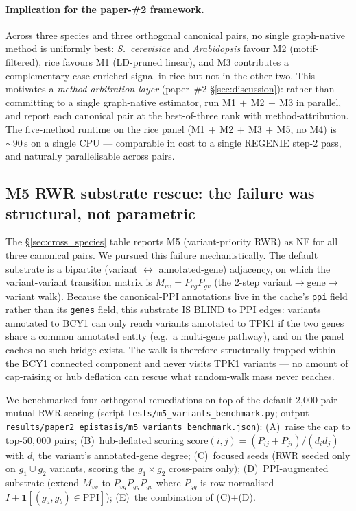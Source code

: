 \paragraph{Implication for the paper-\#2 framework.}
Across three species and three orthogonal canonical pairs, no single
graph-native method is uniformly best: \emph{S.~cerevisiae} and
\emph{Arabidopsis} favour M2 (motif-filtered), rice favours M1
(LD-pruned linear), and M3 contributes a complementary case-enriched
signal in rice but not in the other two. This motivates a
\emph{method-arbitration layer} (paper~\#2 §\ref{sec:discussion}):
rather than committing to a single graph-native estimator, run
M1$\,+\,$M2$\,+\,$M3 in parallel, and report each canonical pair at the
best-of-three rank with method-attribution. The five-method runtime on
the rice panel (M1$\,+\,$M2$\,+\,$M3$\,+\,$M5, no M4) is $\sim 90\,$s on
a single CPU --- comparable in cost to a single REGENIE step-2 pass,
and naturally parallelisable across pairs.

\subsection{M5 RWR substrate rescue: the failure was structural, not parametric}\label{sec:m5_substrate}

The §\ref{sec:cross_species} table reports M5 (variant-priority RWR) as
NF for all three canonical pairs. We pursued this failure
mechanistically. The default substrate is a bipartite (variant
$\leftrightarrow$ annotated-gene) adjacency, on which the variant-variant
transition matrix is $M_{vv} = P_{vg}P_{gv}$ (the 2-step
variant$\to$gene$\to$variant walk). Because the canonical-PPI annotations
live in the cache's \texttt{ppi} field rather than its \texttt{genes}
field, this substrate IS BLIND to PPI edges: variants annotated to BCY1
can only reach variants annotated to TPK1 if the two genes share a
common annotated entity (e.g.\ a multi-gene pathway), and on the panel
caches no such bridge exists. The walk is therefore structurally
trapped within the BCY1 connected component and never visits TPK1
variants --- no amount of cap-raising or hub deflation can rescue what
random-walk mass never reaches.

We benchmarked four orthogonal remediations on top of the default
2{,}000-pair mutual-RWR scoring (script
\texttt{tests/m5\_variants\_benchmark.py}; output
\texttt{results/paper2\_epistasis/m5\_variants\_benchmark.json}):
(A)~raise the cap to top-$50{,}000$ pairs; (B)~hub-deflated scoring
$\mathrm{score}(i,j) = (P_{ij}{+}P_{ji})/(d_i d_j)$ with $d_i$ the
variant's annotated-gene degree; (C)~focused seeds (RWR seeded only on
$g_1\cup g_2$ variants, scoring the $g_1\!\times\!g_2$ cross-pairs only);
(D)~PPI-augmented substrate (extend $M_{vv}$ to $P_{vg}P_{gg}P_{gv}$
where $P_{gg}$ is row-normalised
$I + \mathbf 1[(g_a,g_b)\in\mathrm{PPI}]$); (E)~the combination of (C)+(D).

